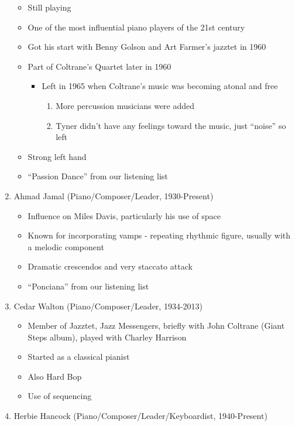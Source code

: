 \documentclass[]{article}
\providecommand{\tightlist}{%
  \setlength{\itemsep}{0pt}\setlength{\parskip}{0pt}}
\begin{document}
\begin{enumerate}
  \begin{itemize}
  \tightlist
  \item
    Still playing
  \item
    One of the most influential piano players of the 21st century
  \item
    Got his start with Benny Golson and Art Farmer's jazztet in 1960
  \item
    Part of Coltrane's Quartet later in 1960

    \begin{itemize}
    \tightlist
    \item
      Left in 1965 when Coltrane's music was becoming atonal and free

      \begin{enumerate}
      \def\labelenumii{\roman{enumii}.}
      \tightlist
      \item
        More percussion musicians were added
      \item
        Tyner didn't have any feelings toward the music, just ``noise''
        so left
      \end{enumerate}
    \end{itemize}
  \item
    Strong left hand
  \item
    ``Passion Dance'' from our listening list
  \end{itemize}
\item
  Ahmad Jamal (Piano/Composer/Leader, 1930-Present)

  \begin{itemize}
  \tightlist
  \item
    Influence on Miles Davis, particularly his use of space
  \item
    Known for incorporating vamps - repeating rhythmic figure, usually
    with a melodic component
  \item
    Dramatic crescendos and very staccato attack
  \item
    ``Ponciana'' from our listening list
  \end{itemize}
\item
  Cedar Walton (Piano/Composer/Leader, 1934-2013)

  \begin{itemize}
  \tightlist
  \item
    Member of Jazztet, Jazz Messengers, briefly with John Coltrane
    (Giant Steps album), played with Charley Harrison
  \item
    Started as a classical pianist
  \item
    Also Hard Bop
  \item
    Use of sequencing
  \end{itemize}
\item
  Herbie Hancock (Piano/Composer/Leader/Keyboardist, 1940-Present)


\end{enumerate}
\end{document}
